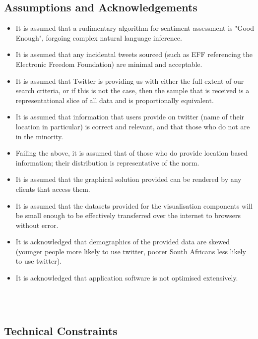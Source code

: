 \documentclass[12pt]{article} %
\begin{document}
\subsection{Assumptions and Acknowledgements}

\begin{itemize}
	
	
	\item It is assumed that a rudimentary algorithm for sentiment assessment is "Good Enough", forgoing complex natural language inference. 
	
	\item It is assumed that any incidental tweets sourced (such as EFF referencing the Electronic Freedom Foundation) are minimal and acceptable.
	
	\item It is assumed that Twitter is providing us with either the full extent of our search criteria, or if this is not the case, then the sample that is received is a representational slice of all data and is proportionally equivalent.
	
	\item It is assumed that information that users provide on twitter (name of their location in particular) is correct and relevant, and that those who do not are in the minority.
	
	\item Failing the above, it is assumed that of those who do provide location based information; their distribution is representative of the norm.
	
	\item It is assumed that the graphical solution provided can be rendered by any clients that access them.
	
	\item It is assumed that the datasets provided for the visualisation components will be small enough to be effectively transferred over the internet to browsers without error.
	
	\item It is acknowledged that demographics of the provided data are skewed (younger people more likely to use twitter, poorer South Africans less likely to use twitter).
	
	\item It is acknowledged that application software is not optimised extensively.
\end{itemize}
	\
	\\
	\
\subsection {Technical Constraints}
\end{document}
